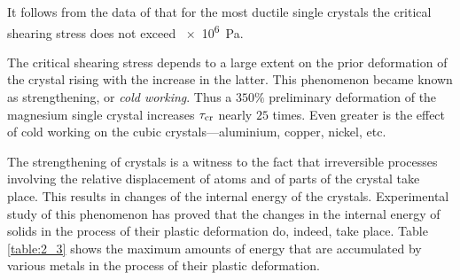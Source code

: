 \begin{table}[!b]
	\renewcommand{\arraystretch}{1.2}
	\caption{}
	\vspace{-0.6cm}
	\label{table:2_2}
	\begin{center}\end{center}
\end{table}

It follows from the data of  that for the most ductile single crystals the critical shearing stress does not exceed \SI{e6}{\pascal}.

The critical shearing stress depends to a large extent on the prior deformation of the crystal rising with the increase in the latter. This phenomenon became known as strengthening, or \textit{cold working}. Thus a $350\%$ preliminary deformation of the magnesium single crystal increases $\tau_{\text{cr}}$ nearly $25$ times. Even greater is the effect of cold working on the cubic crystals---aluminium, copper, nickel, etc.

The strengthening of crystals is a witness to the fact that irreversible processes involving the relative displacement of atoms and of parts of the crystal take place. This results in changes of the internal energy of the crystals. Experimental study of this phenomenon has proved that the changes in the internal energy of solids in the process of their plastic deformation do, indeed, take place. Table \ref{table:2_3} shows the maximum amounts of energy that are accumulated by various metals in the process of their plastic deformation.

